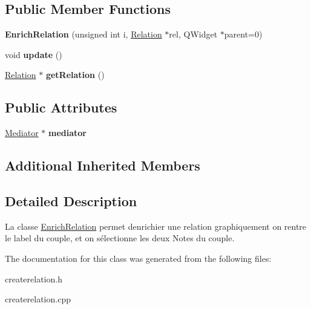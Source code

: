\subsection*{Public Member Functions}
\begin{DoxyCompactItemize}
\item 
\mbox{\label{classEnrichRelation_af11972d2f3e63fee8e0d3fb08aa23c3e}} 
{\bfseries Enrich\+Relation} (unsigned int i, \hyperlink{classRelation}{Relation} $\ast$rel, Q\+Widget $\ast$parent=0)
\item 
\mbox{\label{classEnrichRelation_a4767b19304b8175777399d85071ffc20}} 
void {\bfseries update} ()
\item 
\mbox{\label{classEnrichRelation_a62a4c39cb31a215a260a0ba912b6fcaf}} 
\hyperlink{classRelation}{Relation} $\ast$ {\bfseries get\+Relation} ()
\end{DoxyCompactItemize}
\subsection*{Public Attributes}
\begin{DoxyCompactItemize}
\item 
\mbox{\label{classEnrichRelation_a44ba22c9011cf006f8be87329e9ae460}} 
\hyperlink{classMediator}{Mediator} $\ast$ {\bfseries mediator}
\end{DoxyCompactItemize}
\subsection*{Additional Inherited Members}


\subsection{Detailed Description}
La classe \hyperlink{classEnrichRelation}{Enrich\+Relation} permet d\textquotesingle{}enrichier une relation graphiquement on rentre le label du couple, et on sélectionne les deux Notes du couple. 

The documentation for this class was generated from the following files\+:\begin{DoxyCompactItemize}
\item 
createrelation.\+h\item 
createrelation.\+cpp\end{DoxyCompactItemize}
